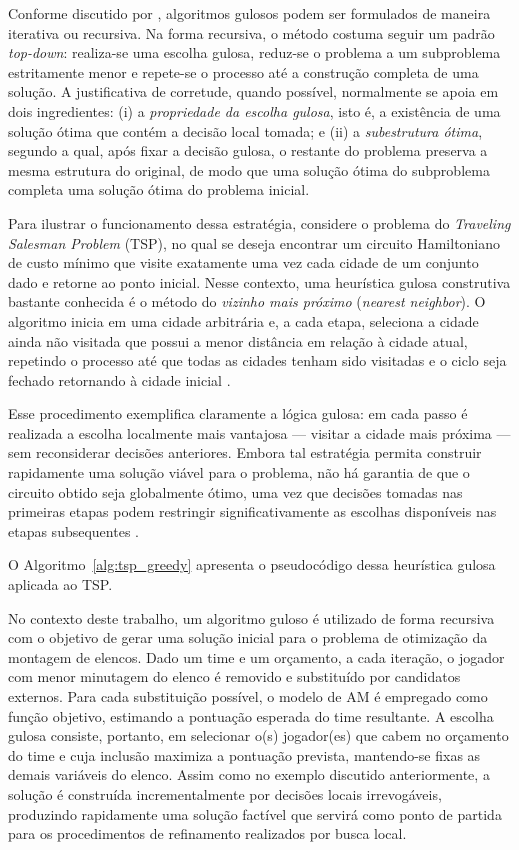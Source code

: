 Conforme discutido por \cite{Cormen2009}, algoritmos gulosos podem ser formulados de maneira iterativa ou recursiva. Na forma recursiva, o método costuma
seguir um padrão \textit{top-down}: realiza-se uma escolha gulosa, reduz-se o problema a um subproblema estritamente menor e repete-se o processo até a
construção completa de uma solução. A justificativa de corretude, quando possível, normalmente se apoia em dois ingredientes: (i) a \textit{propriedade da
escolha gulosa}, isto é, a existência de uma solução ótima que contém a decisão local tomada; e (ii) a \textit{subestrutura ótima}, segundo a qual, após
fixar a decisão gulosa, o restante do problema preserva a mesma estrutura do original, de modo que uma solução ótima do subproblema completa uma solução
ótima do problema inicial.

Para ilustrar o funcionamento dessa estratégia, considere o problema do \textit{Traveling Salesman Problem} (TSP), no qual se deseja encontrar um circuito
Hamiltoniano de custo mínimo que visite exatamente uma vez cada cidade de um conjunto dado e retorne ao ponto inicial. Nesse contexto, uma heurística gulosa
construtiva bastante conhecida é o método do \textit{vizinho mais próximo} (\textit{nearest neighbor}). O algoritmo inicia em uma cidade arbitrária e,
a cada etapa, seleciona a cidade ainda não visitada que possui a menor distância em relação à cidade atual, repetindo o processo até que todas as
cidades tenham sido visitadas e o ciclo seja fechado retornando à cidade inicial \cite{Gendreau2010}.

Esse procedimento exemplifica claramente a lógica gulosa: em cada passo é realizada a escolha localmente mais vantajosa — visitar a cidade mais próxima —
sem reconsiderar decisões anteriores. Embora tal estratégia permita construir rapidamente uma solução viável para o problema, não há garantia de que o
circuito obtido seja globalmente ótimo, uma vez que decisões tomadas nas primeiras etapas podem restringir significativamente as escolhas disponíveis
nas etapas subsequentes \cite{Gendreau2010}.

O Algoritmo~\ref{alg:tsp_greedy} apresenta o pseudocódigo dessa heurística gulosa aplicada ao TSP.



No contexto deste trabalho, um algoritmo guloso é utilizado de forma recursiva com o objetivo de gerar uma solução inicial para o problema de otimização da
montagem de elencos. Dado um time e um orçamento, a cada iteração, o jogador com menor minutagem do elenco é removido e substituído por candidatos externos.
Para cada substituição possível, o modelo de AM é empregado como função objetivo, estimando a pontuação esperada do time resultante. A escolha gulosa
consiste, portanto, em selecionar o(s) jogador(es) que cabem no orçamento do time e cuja inclusão maximiza a pontuação prevista, mantendo-se fixas as
demais variáveis do elenco. Assim como no exemplo discutido anteriormente, a solução é construída incrementalmente por decisões locais irrevogáveis,
produzindo rapidamente uma solução factível que servirá como ponto de partida para os procedimentos de refinamento realizados por busca local.

